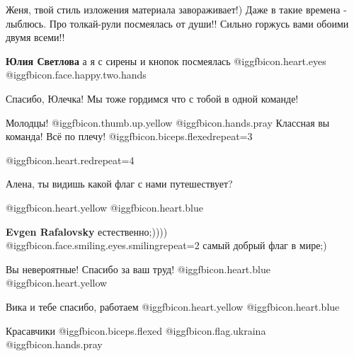 \begin{itemize}

Женя, твой стиль изложения материала завораживает!) Даже в такие времена -
лыблюсь. Про толкай-рули посмеялась от души!!  Сильно горжусь вами обоими двумя
всеми!!

\begin{itemize} %
\textbf{Юлия Светлова} а я с сирены и кнопок посмеялась  @igg{fbicon.heart.eyes}  @igg{fbicon.face.happy.two.hands} 

Спасибо, Юлечка! Мы тоже гордимся что с тобой в одной команде!
\end{itemize} %

Молодцы!  @igg{fbicon.thumb.up.yellow}  @igg{fbicon.hands.pray}  Классная вы команда! Всё по плечу!  @igg{fbicon.biceps.flexed}{repeat=3} 

@igg{fbicon.heart.red}{repeat=4}

\begin{itemize} %
Алена, ты видишь какой флаг с нами путешествует?

 @igg{fbicon.heart.yellow}  @igg{fbicon.heart.blue} 

\textbf{Evgen Rafalovsky} естественно;))))  @igg{fbicon.face.smiling.eyes.smiling}{repeat=2}  самый добрый флаг в мире;)

\end{itemize} %

Вы невероятные! Спасибо за ваш труд! @igg{fbicon.heart.blue}  @igg{fbicon.heart.yellow} 

Вика и тебе спасибо, работаем  @igg{fbicon.heart.yellow}  @igg{fbicon.heart.blue} 

Красавчики  @igg{fbicon.biceps.flexed} @igg{fbicon.flag.ukraina} @igg{fbicon.hands.pray} 

\end{itemize} %
